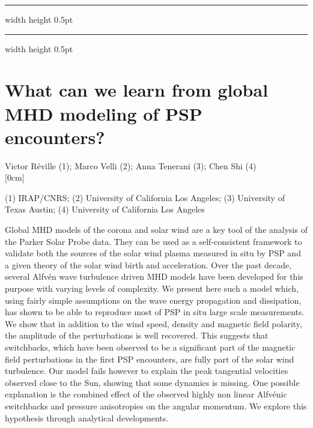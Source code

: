 \documentclass[a4paper,11pt]{book}
\def\doubleline{
\hrule width \hsize height 0.5pt  \kern 1mm \hrule width \hsize height 0.5pt 
}
\begin{document}
\noindent\doubleline
        
          \section[What can we learn from global MHD modeling of PSP encounters?  \newline(Victor Réville)] { What can we learn from global MHD modeling of PSP encounters?  }



\begin{center}
{\large Victor Réville (1)};{ \large  Marco Velli (2)};{ \large  Anna Tenerani (3)};{ \large  Chen Shi (4)}\\



[0cm]



   
  
\vspace{2 mm}
\noindent (1) IRAP/CNRS; (2)  University of California Los Angeles; (3)  University of Texas Austin; (4)  University of California Los Angeles\\

\end{center}



  
\vspace{2 mm}
\noindent 
Global MHD models of the corona and solar wind are a key tool of the analysis of the Parker Solar Probe data. They can be used as a self-consistent framework to validate both the sources of the solar wind plasma measured in situ by PSP and a given theory of the solar wind birth and acceleration. Over the past decade, several Alfvén wave turbulence driven MHD models have been developed for this purpose with varying levels of complexity. We present here such a model which, using fairly simple assumptions on the wave energy propagation and dissipation, has shown to be able to reproduce most of PSP in situ large scale measurements. We show that in addition to the wind speed, density and magnetic field polarity, the amplitude of the perturbations is well recovered. This suggests that switchbacks, which have been observed to be a significant part of the magnetic field perturbations in the first PSP encounters, are fully part of the solar wind turbulence. Our model fails however to explain the peak tangential velocities observed close to the Sun, showing that some dynamics is missing. One possible explanation is the combined effect of the observed highly non linear Alfvénic switchbacks and pressure anisotropies on the angular momentum. We explore this hypothesis through analytical developments. 
\end{document}
